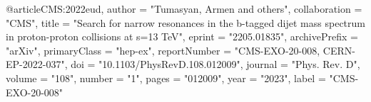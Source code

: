 @article{CMS:2022eud,
    author = "Tumasyan, Armen and others",
    collaboration = "CMS",
    title = "{Search for narrow resonances in the b-tagged dijet mass spectrum in proton-proton collisions at s=13\,\,TeV}",
    eprint = "2205.01835",
    archivePrefix = "arXiv",
    primaryClass = "hep-ex",
    reportNumber = "CMS-EXO-20-008, CERN-EP-2022-037",
    doi = "10.1103/PhysRevD.108.012009",
    journal = "Phys. Rev. D",
    volume = "108",
    number = "1",
    pages = "012009",
    year = "2023",
    label = "CMS-EXO-20-008"
}
